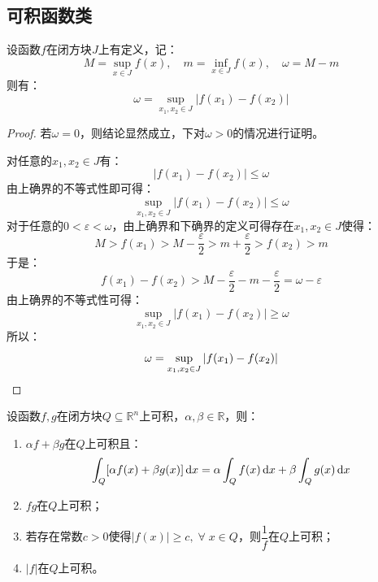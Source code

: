 \subsection{可积函数类}
\begin{lemma}\label{lem:omega=SupVari}
	设函数$f$在闭方块$J$上有定义，记：
	\begin{equation*}
		M=\sup_{x\in J}f(x),\quad m=\inf_{x\in J}f(x),\quad\omega=M-m
	\end{equation*}
	则有：
	\begin{equation*}
		\omega=\sup_{x_1,x_2\in J}|f(x_1)-f(x_2)|
	\end{equation*}
\end{lemma}
\begin{proof}
	若$\omega=0$，则结论显然成立，下对$\omega>0$的情况进行证明。\par
	对任意的$x_1,x_2\in J$有：
	\begin{equation*}
		|f(x_1)-f(x_2)|\leqslant\omega
	\end{equation*}
	由上确界的不等式性即可得：
	\begin{equation*}
		\sup_{x_1,x_2\in J}|f(x_1)-f(x_2)|\leqslant\omega
	\end{equation*}
	对于任意的$0<\varepsilon<\omega$，由上确界和下确界的定义可得存在$x_1,x_2\in J$使得：
	\begin{equation*}
		M>f(x_1)>M-\frac{\varepsilon}{2}>m+\frac{\varepsilon}{2}>f(x_2)>m
	\end{equation*}
	于是：
	\begin{equation*}
		f(x_1)-f(x_2)>M-\frac{\varepsilon}{2}-m-\frac{\varepsilon}{2}=\omega-\varepsilon
	\end{equation*}
	由上确界的不等式性可得：
	\begin{equation*}
		\sup_{x_1,x_2\in J}|f(x_1)-f(x_2)|\geqslant\omega
	\end{equation*}
	所以：
	\begin{equation*}
		\omega=\sup_{x_1,x_2\in J}|f(x_1)-f(x_2)|\qedhere
	\end{equation*}
\end{proof}
\begin{theorem}\label{theo:RiemannIntegrable4ArithmeticOperation}
	设函数$f,g$在闭方块$Q\subseteq\mathbb{R}^n$上可积，$\alpha,\beta\in\mathbb{R}$，则：
	\begin{enumerate}
		\item $\alpha f+\beta g$在$Q$上可积且：
		\begin{equation*}
			\int_Q[\alpha f(x)+\beta g(x)]\mathop{}\!\mathrm{d} x=\alpha\int_Qf(x)\mathop{}\!\mathrm{d} x+\beta\int_Qg(x)\mathop{}\!\mathrm{d} x
		\end{equation*}
		\item $fg$在$Q$上可积；
		\item 若存在常数$c>0$使得$|f(x)|\geqslant c,\;\forall\;x\in Q$，则$\dfrac{1}{f}$在$Q$上可积；
		\item $|f|$在$Q$上可积。
	\end{enumerate}
\end{theorem}

